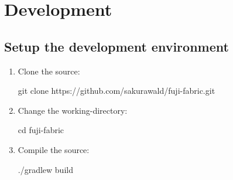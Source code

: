\chapter{Development}\label{ch:development}


\section{Setup the development environment}
\begin{enumerate}
    \item Clone the source:
    \begin{sh}
        git clone https://github.com/sakurawald/fuji-fabric.git
    \end{sh}
    \item Change the working-directory:
    \begin{sh}
        cd fuji-fabric
    \end{sh}
    \item Compile the source:
    \begin{sh}
              ./gradlew build
    \end{sh}
\end{enumerate}
